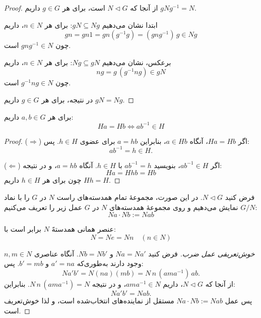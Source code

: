 \begin{proof}
    از آنجا که \(N \triangleleft G\) است، برای هر \(g \in G\) داریم \(gNg^{-1} = N\).

    ابتدا نشان می‌دهیم \(gN \subseteq Ng\): برای هر \(n \in N\)، داریم
    \[
        gn = gn1 = gn(g^{-1}g) =(gng^{-1})\,g \in Ng
    \]
    چون \(gng^{-1} \in N\) است.

    برعکس، نشان می‌دهیم \(Ng \subseteq gN\): برای هر \(n \in N\)، داریم
    \[
        ng = g\,(g^{-1}ng) \in gN
    \]
    چون \(g^{-1}ng \in N\) است.

    در نتیجه، برای هر \(g \in G\) داریم \(gN = Ng\).
\end{proof}

\begin{remark}
    برای هر $a,b \in G$ داریم:
    \[
        Ha = Hb \iff ab^{-1} \in H
    \]
\end{remark}

\begin{proof}
    (\(\Rightarrow\)) اگر \(Ha = Hb\)، آنگاه \(a \in Hb\)، بنابراین \(a = hb\) برای عضوی \(h \in H\). پس:
    \[
        ab^{-1} = h \in H.
    \]

    (\(\Leftarrow\)) اگر \(ab^{-1} \in H\)، بنویسید \(ab^{-1} = h\) با \(h \in H\). آنگاه \(a = hb\)، و در نتیجه:
    \[
        Ha = Hhb = Hb
    \]
    چون برای هر \(h \in H\) داریم \(Hh = H\).
\end{proof}


\begin{definition}
    فرض کنید $N \triangleleft G$. در این صورت، مجموعهٔ تمام همدسته‌های راست $N$ در $G$ را با نماد $G / N$ نمایش می‌دهیم و روی مجموعهٔ همدسته‌های $N$ در $G$ عمل زیر را تعریف می‌کنیم:
    \[
        Na \cdot Nb := Nab
    \]

    عنصر همانی همدستهً $N$ برابر است با:
    \[
        N = Ne = Nn \quad (n \in N)
    \]
\end{definition}

\begin{proof}[خوش‌تعریفی عمل ضرب]
    فرض کنید \(Na = Na'\) و \(Nb = Nb'\). آنگاه عناصری \(n, m \in N\) وجود دارند به‌طوری‌که
    \(a' = na\) و \(b' = mb\). پس:
    \[
        Na'b' = N(na)(mb) = N\,n\,(a m a^{-1})\,ab.
    \]
    از آنجا که \(N \triangleleft G\)، داریم \(a m a^{-1} \in N\)، و در نتیجه
    \(N\,n\,(a m a^{-1}) = N\). بنابراین:
    \[
        Na'b' = N ab.
    \]
    پس عمل \(Na \cdot Nb := Nab\) مستقل از نماینده‌های انتخاب‌شده است،
    و لذا خوش‌تعریف است.
\end{proof}





